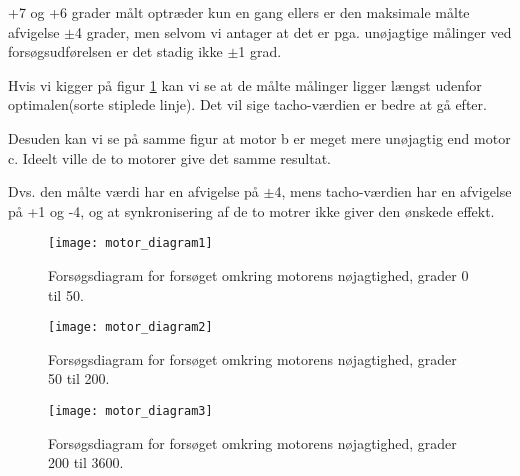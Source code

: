 +7 og +6 grader målt optræder kun en gang ellers er den maksimale målte afvigelse $\pm$4 grader, men selvom vi antager at det er pga. unøjagtige målinger ved forsøgsudførelsen er det stadig ikke $\pm$1 grad.

Hvis vi kigger på figur \ref{sensor:motor_sensor_diagram1}
kan vi se at de målte målinger ligger længst udenfor optimalen(sorte stiplede linje).
Det vil sige tacho-værdien er bedre at gå efter.

Desuden kan vi se på samme figur at motor b er meget mere unøjagtig end motor c.
Ideelt ville de to motorer give det samme resultat.

Dvs. den målte værdi har en afvigelse på $\pm$4, mens tacho-værdien har en afvigelse på +1 og -4, og at synkronisering af de to motrer ikke giver den ønskede effekt.

\begin{figure}[h]
\centering
\texttt{[image: motor\_diagram1]} 	
\caption{Forsøgsdiagram for forsøget omkring motorens nøjagtighed, grader 0 til 50.}
\label{sensor:motor_sensor_diagram1}
\end{figure}

\begin{figure}[h]
\centering
\texttt{[image: motor\_diagram2]} 	
\caption{Forsøgsdiagram for forsøget omkring motorens nøjagtighed, grader 50 til 200.}
\label{sensor:motor_sensor_diagram2}
\end{figure}

\begin{figure}[h]
\centering
\texttt{[image: motor\_diagram3]} 	
\caption{Forsøgsdiagram for forsøget omkring motorens nøjagtighed, grader 200 til 3600.}
\label{sensor:motor_sensor_diagram3}
\end{figure}